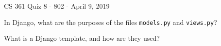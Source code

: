 \documentclass{exam}
\begin{document}
\begin{center}
	CS 361 Quiz 8 - 802 - April 9, 2019
\end{center}

\vspace{1em}

\begin{center}
\end{center}

\begin{questions}
	
\question[6] In Django, what are the purposes of the files \texttt{models.py} and \texttt{views.py}?
\vfill

\question[4] What is a Django template, and how are they used?
\vfill
\end{questions}
\end{document}

